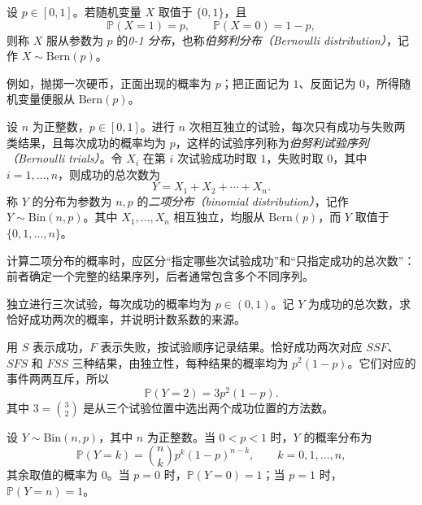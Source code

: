 \documentclass[UTF8,12pt,a4paper,fontset=fandol]{ctexbook}
\begin{document}
\begin{definition}
\label{def:study-bernoulli-distribution}
设 $p\in[0,1]$。若随机变量 $X$ 取值于 $\{0,1\}$，且
\begin{equation}
  \mathbb P(X=1)=p,\qquad \mathbb P(X=0)=1-p,
  \label{eq:study-bernoulli-mass}
\end{equation}
则称 $X$ 服从参数为 $p$ 的\emph{0-1 分布}，也称\emph{伯努利分布（Bernoulli distribution）}，记作 $X\sim\mathrm{Bern}(p)$。
\end{definition}

例如，抛掷一次硬币，正面出现的概率为 $p$；把正面记为 $1$、反面记为 $0$，所得随机变量便服从 $\mathrm{Bern}(p)$。

\begin{definition}
\label{def:study-binomial-distribution}
设 $n$ 为正整数，$p\in[0,1]$。进行 $n$ 次相互独立的试验，每次只有成功与失败两类结果，且每次成功的概率均为 $p$，这样的试验序列称为\emph{伯努利试验序列（Bernoulli trials）}。令 $X_i$ 在第 $i$ 次试验成功时取 $1$，失败时取 $0$，其中 $i=1,\ldots,n$，则成功的总次数为
\begin{equation}
  Y=X_1+X_2+\cdots+X_n.
  \label{eq:study-binomial-sum}
\end{equation}
称 $Y$ 的分布为参数为 $n,p$ 的\emph{二项分布（binomial distribution）}，记作 $Y\sim\mathrm{Bin}(n,p)$。其中 $X_1,\ldots,X_n$ 相互独立，均服从 $\mathrm{Bern}(p)$，而 $Y$ 取值于 $\{0,1,\ldots,n\}$。
\end{definition}

计算二项分布的概率时，应区分“指定哪些次试验成功”和“只指定成功的总次数”：前者确定一个完整的结果序列，后者通常包含多个不同序列。

\begin{example}
\label{ex:study-binomial-three-trials}
独立进行三次试验，每次成功的概率均为 $p\in(0,1)$。记 $Y$ 为成功的总次数，求恰好成功两次的概率，并说明计数系数的来源。
\end{example}

\begin{solve}
用 $S$ 表示成功，$F$ 表示失败，按试验顺序记录结果。恰好成功两次对应 $SSF$、$SFS$ 和 $FSS$ 三种结果，由独立性，每种结果的概率均为 $p^2(1-p)$。它们对应的事件两两互斥，所以
\begin{equation}
  \mathbb P(Y=2)=3p^2(1-p).
  \label{eq:study-binomial-three-trials}
\end{equation}
其中 $3=\binom32$ 是从三个试验位置中选出两个成功位置的方法数。
\end{solve}

\begin{proposition}
\label{prop:study-binomial-mass}
设 $Y\sim\mathrm{Bin}(n,p)$，其中 $n$ 为正整数。当 $0<p<1$ 时，$Y$ 的概率分布为
\begin{equation}
  \mathbb P(Y=k)=\binom nk p^k(1-p)^{n-k},
  \qquad k=0,1,\ldots,n,
  \label{eq:study-binomial-mass}
\end{equation}
其余取值的概率为 $0$。当 $p=0$ 时，$\mathbb P(Y=0)=1$；当 $p=1$ 时，$\mathbb P(Y=n)=1$。
\end{proposition}
\end{document}

